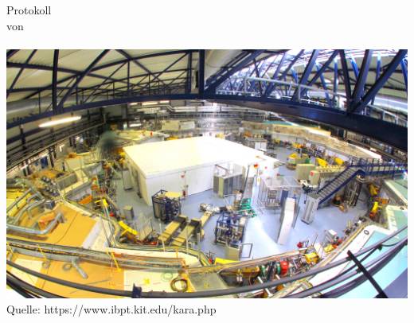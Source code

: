\begin{titlepage}
    \vspace*{2cm}
    \Large Protokoll\\von\\
    \vspace*{1cm}
    \huge\thesisauthor\\




    \vspace*{1.5cm}
    \includegraphics[scale=0.45]{./include/KIT_synchrotron_light_source_hall_view.jpg}\\
    \small{Quelle: https://www.ibpt.kit.edu/kara.php}







\end{titlepage}
